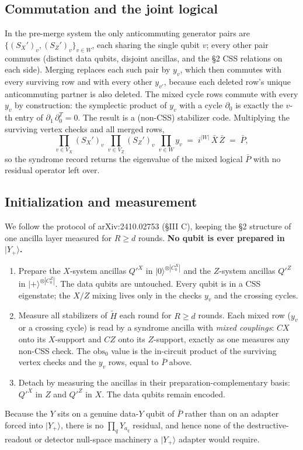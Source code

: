 \documentclass[a4paper, 12pt]{article}
\begin{document}
\subsection{Commutation and the joint logical}
In the pre-merge system the only anticommuting generator pairs are
$\{(S_X')_v, (S_Z')_v\}_{v\in W}$, each sharing the single qubit $v$; every other pair commutes
(distinct data qubits, disjoint ancillas, and the \S 2 CSS relations on each side). Merging
replaces each such pair by $y_v$, which then commutes with every surviving row and with every
other $y_{v'}$, because each deleted row's unique anticommuting partner is also deleted. The
mixed cycle rows commute with every $y_v$ by construction: the symplectic product of $y_v$ with
a cycle $\partial_0$ is exactly the $v$-th entry of $\partial_1\,\partial_0^T = 0$. The result
is a (non-CSS) stabilizer code. Multiplying the surviving vertex checks and all merged rows,
\begin{equation}
\prod_{v\in V_X} (S_X')_v \;\prod_{v\in V_Z} (S_Z')_v \;\prod_{v\in W} y_v
\;=\; i^{|W|}\, \bar X\, \bar Z \;=\; \bar P,
\end{equation}
so the syndrome record returns the eigenvalue of the mixed logical $\bar P$ with no residual
operator left over.

\subsection{Initialization and measurement}
We follow the protocol of arXiv:2410.02753 (\S III C), keeping the \S 2 structure of one ancilla
layer measured for $R \geq d$ rounds. \textbf{No qubit is ever prepared in $|Y_+\rangle$.}
\begin{enumerate}
\item Prepare the $X$-system ancillas $Q'^X$ in $|0\rangle^{\otimes|C_0^X|}$ and the $Z$-system
ancillas $Q'^Z$ in $|+\rangle^{\otimes|C_0^Z|}$. The data qubits are untouched. Every qubit is
in a CSS eigenstate; the $X/Z$ mixing lives only in the checks $y_v$ and the crossing cycles.
\item Measure all stabilizers of $\tilde H$ each round for $R \geq d$ rounds. Each mixed row
($y_v$ or a crossing cycle) is read by a syndrome ancilla with \emph{mixed couplings}: $CX$ onto
its $X$-support and $CZ$ onto its $Z$-support, exactly as one measures any non-CSS check. The
$\mathrm{obs}_0$ value is the in-circuit product of the surviving vertex checks and the $y_v$
rows, equal to $\bar P$ above.
\item Detach by measuring the ancillas in their preparation-complementary basis: $Q'^X$ in $Z$
and $Q'^Z$ in $X$. The data qubits remain encoded.
\end{enumerate}
Because the $Y$ sits on a genuine data-$Y$ qubit of $\bar P$ rather than on an adapter forced
into $|Y_+\rangle$, there is no $\prod_q Y_{a_q}$ residual, and hence none of the
destructive-readout or detector null-space machinery a $|Y_+\rangle$ adapter would require.
\end{document}
